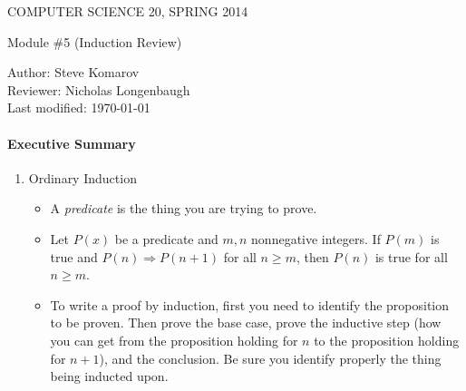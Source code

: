 \documentclass[12pt]{article}
\begin{document}
\begin{center}
COMPUTER SCIENCE 20, SPRING 2014 \\
\smallskip

Module \#5 (Induction Review)
\end{center}
Author: Steve Komarov\\
Reviewer: Nicholas Longenbaugh\\
Last modified: \today\\

\paragraph*{Executive Summary}

\begin{enumerate}

\item Ordinary Induction
\begin{itemize}
\item A {\em predicate} is the thing you are trying to prove.
\item Let $P(x)$ be a predicate and $m, n$ nonnegative integers.  If $P(m)$ is true and $P(n) \Rightarrow P(n+1)$ for all $n \ge m$, then $P(n)$ is true for all $n \ge m$.

\item To write a proof by induction, first you need to identify the proposition to be proven.  Then prove the base case, prove the inductive step (how you can get from the proposition holding for $n$ to the proposition holding for $n+1$), and the conclusion.  Be sure you identify properly the thing being inducted upon.
\end{itemize}


\end{enumerate}
\end{document}

